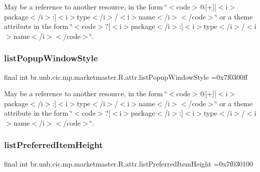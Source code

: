 May be a reference to another resource, in the form \char`\"{}$<$code$>$@\mbox{[}+\mbox{]}\mbox{[}$<$i$>$package$<$/i$>$\+:\mbox{]}$<$i$>$type$<$/i$>$/$<$i$>$name$<$/i$>$$<$/code$>$\char`\"{} or a theme attribute in the form \char`\"{}$<$code$>$?\mbox{[}$<$i$>$package$<$/i$>$\+:\mbox{]}$<$i$>$type$<$/i$>$/$<$i$>$name$<$/i$>$$<$/code$>$\char`\"{}. \mbox{\label{classbr_1_1unb_1_1cic_1_1mp_1_1marketmaster_1_1R_1_1attr_a732cdc9205ea553e91412bb0eab8e26d}} 
\subsubsection{\texorpdfstring{list\+Popup\+Window\+Style}{listPopupWindowStyle}}
{\footnotesize\ttfamily final int br.\+unb.\+cic.\+mp.\+marketmaster.\+R.\+attr.\+list\+Popup\+Window\+Style =0x7f0300ff\hspace{0.3cm}{\ttfamily [static]}}

May be a reference to another resource, in the form \char`\"{}$<$code$>$@\mbox{[}+\mbox{]}\mbox{[}$<$i$>$package$<$/i$>$\+:\mbox{]}$<$i$>$type$<$/i$>$/$<$i$>$name$<$/i$>$$<$/code$>$\char`\"{} or a theme attribute in the form \char`\"{}$<$code$>$?\mbox{[}$<$i$>$package$<$/i$>$\+:\mbox{]}$<$i$>$type$<$/i$>$/$<$i$>$name$<$/i$>$$<$/code$>$\char`\"{}. \mbox{\label{classbr_1_1unb_1_1cic_1_1mp_1_1marketmaster_1_1R_1_1attr_a09ff6aadd822b80e15ee20a662472ddd}} 
\subsubsection{\texorpdfstring{list\+Preferred\+Item\+Height}{listPreferredItemHeight}}
{\footnotesize\ttfamily final int br.\+unb.\+cic.\+mp.\+marketmaster.\+R.\+attr.\+list\+Preferred\+Item\+Height =0x7f030100\hspace{0.3cm}{\ttfamily [static]}}

